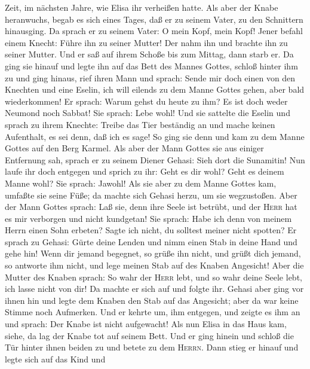 Zeit, im nächsten Jahre, wie Elisa ihr verheißen hatte. 
Als aber der Knabe heranwuchs, begab es sich eines Tages, daß er zu
seinem Vater, zu den Schnittern hinausging.  Da sprach er
zu seinem Vater: O mein Kopf, mein Kopf! Jener befahl einem Knecht:
Führe ihn zu seiner Mutter!  Der nahm ihn und brachte ihn
zu seiner Mutter. Und er saß auf ihrem Schoße bis zum Mittag, dann starb
er.  Da ging sie hinauf und legte ihn auf das Bett des
Mannes Gottes, schloß hinter ihm zu und ging hinaus, 
rief ihren Mann und sprach: Sende mir doch einen von den Knechten und
eine Eselin, ich will eilends zu dem Manne Gottes gehen, aber bald
wiederkommen!  Er sprach: Warum gehst du heute zu ihm? Es
ist doch weder Neumond noch Sabbat! Sie sprach: Lebe wohl!
 Und sie sattelte die Eselin und sprach zu ihrem Knechte:
Treibe das Tier beständig an und mache keinen Aufenthalt, es sei denn,
daß ich es sage!  So ging sie denn und kam zu dem Manne
Gottes auf den Berg Karmel. Als aber der Mann Gottes sie aus einiger
Entfernung sah, sprach er zu seinem Diener Gehasi: Sieh dort die
Sunamitin!  Nun laufe ihr doch entgegen und sprich zu
ihr: Geht es dir wohl? Geht es deinem Manne wohl? Sie sprach: Jawohl!
 Als sie aber zu dem Manne Gottes kam, umfaßte sie seine
Füße; da machte sich Gehasi herzu, um sie wegzustoßen. Aber der Mann
Gottes sprach: Laß sie, denn ihre Seele ist betrübt, und der
\textsc{Herr} hat es mir verborgen und nicht kundgetan! 
Sie sprach: Habe ich denn von meinem Herrn einen Sohn erbeten? Sagte ich
nicht, du solltest meiner nicht spotten?  Er sprach zu
Gehasi: Gürte deine Lenden und nimm einen Stab in deine Hand und gehe
hin! Wenn dir jemand begegnet, so grüße ihn nicht, und grüßt dich
jemand, so antworte ihm nicht, und lege meinen Stab auf des Knaben
Angesicht!  Aber die Mutter des Knaben sprach: So wahr
der \textsc{Herr} lebt, und so wahr deine Seele lebt, ich lasse nicht
von dir! Da machte er sich auf und folgte ihr.  Gehasi
aber ging vor ihnen hin und legte dem Knaben den Stab auf das Angesicht;
aber da war keine Stimme noch Aufmerken. Und er kehrte um, ihm entgegen,
und zeigte es ihm an und sprach: Der Knabe ist nicht aufgewacht!
 Als nun Elisa in das Haus kam, siehe, da lag der Knabe
tot auf seinem Bett.  Und er ging hinein und schloß die
Tür hinter ihnen beiden zu und betete zu dem \textsc{Herrn}.
 Dann stieg er hinauf und legte sich auf das Kind und
